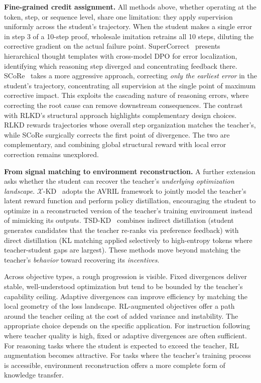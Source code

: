 \documentclass{article} %
\begin{document}
\textbf{Fine-grained credit assignment.} All methods above, whether operating at the token, step, or sequence level, share one limitation: they apply supervision uniformly across the student's trajectory. When the student makes a single error in step 3 of a 10-step proof, wholesale imitation retrains all 10 steps, diluting the corrective gradient on the actual failure point. SuperCorrect~\citep{2410.09008} presents hierarchical thought templates with cross-model DPO for error localization, identifying which reasoning step diverged and concentrating feedback there. SCoRe~\citep{2509.14257} takes a more aggressive approach, correcting \emph{only the earliest error} in the student's trajectory, concentrating all supervision at the single point of maximum corrective impact. This exploits the cascading nature of reasoning errors, where correcting the root cause can remove downstream consequences. The contrast with RLKD's structural approach highlights complementary design choices. RLKD rewards trajectories whose overall step organization matches the teacher's, while SCoRe surgically corrects the first point of divergence. The two are complementary, and combining global structural reward with local error correction remains unexplored.

\textbf{From signal matching to environment reconstruction.} A further extension asks whether the student can recover the teacher's \emph{underlying optimization landscape}. $\mathcal{X}$-KD~\citep{2602.12674} adopts the AVRIL framework to jointly model the teacher's latent reward function and perform policy distillation, encouraging the student to optimize in a reconstructed version of the teacher's training environment instead of mimicking its outputs. TSD-KD~\citep{2603.13260} combines indirect distillation (student generates candidates that the teacher re-ranks via preference feedback) with direct distillation (KL matching applied selectively to high-entropy tokens where teacher-student gaps are largest). These methods move beyond matching the teacher's \emph{behavior} toward recovering its \emph{incentives}.

Across objective types, a rough progression is visible. Fixed divergences deliver stable, well-understood optimization but tend to be bounded by the teacher's capability ceiling. Adaptive divergences can improve efficiency by matching the local geometry of the loss landscape. RL-augmented objectives offer a path around the teacher ceiling at the cost of added variance and instability. The appropriate choice depends on the specific application. For instruction following where teacher quality is high, fixed or adaptive divergences are often sufficient. For reasoning tasks where the student is expected to exceed the teacher, RL augmentation becomes attractive. For tasks where the teacher's training process is accessible, environment reconstruction offers a more complete form of knowledge transfer.
\end{document}
